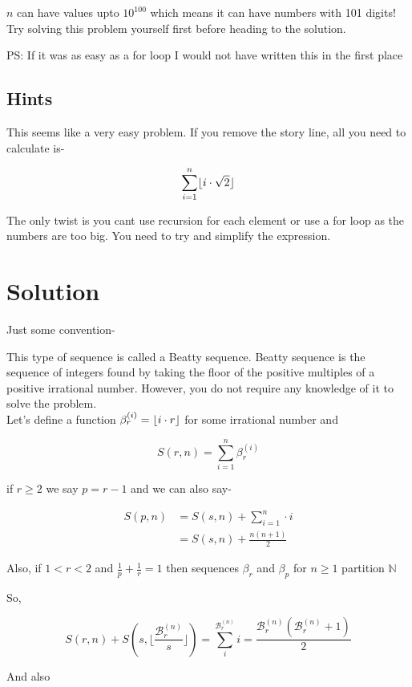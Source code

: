 \documentclass[12pt]{article}
\DeclarePairedDelimiter\floor{\lfloor}{\rfloor}
\begin{document}
$n$ can have values upto $10^100$ which means it can have numbers 
with 101 digits! Try solving this problem yourself first before
heading to the solution.

PS: If it was as easy as a for loop I would not have written this in
the first place

\subsection*{Hints}

This seems like a very easy problem. If you remove the story line, 
all you need to calculate is-

$$\sum_{i=1}^n \floor{i \cdot \sqrt{2}}$$

The only twist is you cant use recursion for each element or use a
for loop as the numbers are too big. You need to try and simplify
the expression.

\section*{Solution}

Just some convention-

This type of sequence is called a  Beatty sequence. Beatty sequence
is the sequence of integers found by taking the floor of the
positive multiples of a positive irrational number. However, you do
not require any knowledge of it to solve the problem. \\

Let's define a function $\beta _r ^{(i)} = \floor{i \cdot r}$ for 
some irrational number and

$$S(r,n) = \sum_{i=1}^n \beta _r ^{(i)}$$

if $r \geq 2$ we say $p = r - 1$ and we can also say-

\begin{align*}
S(p,n)&=S(s,n) + \sum_{i=1}^n \cdot i \\
&=S(s,n) + \frac{n(n+1)}{2}
\end{align*}

Also, if $1 < r < 2$ and $\frac{1}{p} + \frac{1}{r} = 1$ then 
sequences $\beta_r$ and $\beta_p$ for $n \geq 1$ partition
$\mathbb{N}$

So,

$$S(r, n) + S(s, \lfloor \frac{\mathcal{B}_r^{(n)}}{s} \rfloor) =
\sum_i^{\mathcal{B}_r^{(n)}} i =
\frac{\mathcal{B}_r^{(n)}(\mathcal{B}_r^{(n)} + 1)}{2}$$

And also
\end{document}
